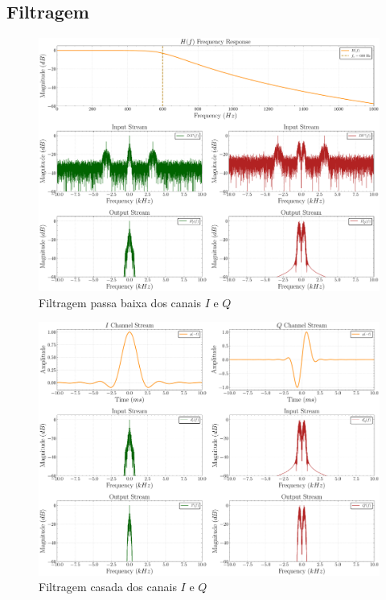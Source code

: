 \subsection{Filtragem}\label{sec:filtragem}

\begin{figure}[H]
	\centering
	\caption{Filtragem passa baixa dos canais $I$ e $Q$}\label{fig:receiver_lpf}
	\includegraphics[width=\linewidth]{assets/cap3/receiver_lpf_freq.pdf}
\end{figure}

\begin{figure}[H]
	\centering
	\caption{Filtragem casada dos canais $I$ e $Q$}\label{fig:receiver_matchedfilter}
	\includegraphics[width=\linewidth]{assets/cap3/receiver_mf_freq.pdf}
\end{figure}

